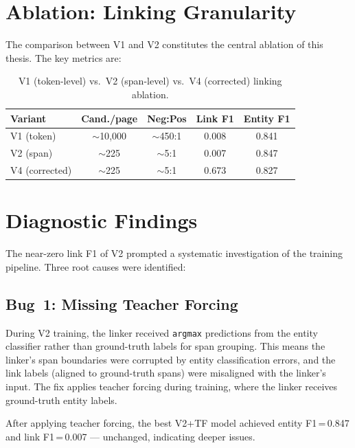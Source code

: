 \section{Ablation: Linking Granularity}
\label{sec:linking-ablation}

The comparison between V1 and V2 constitutes the central ablation of this
thesis. The key metrics are:

\begin{table}[ht]
  \centering
  \caption{V1 (token-level) vs.\ V2 (span-level) vs.\ V4 (corrected) linking ablation.}
  \label{tab:v1-v2-ablation}
  \small
  \begin{tabular}{@{}lcccc@{}}
    \toprule
    \textbf{Variant} & \textbf{Cand./page} & \textbf{Neg:Pos}
                     & \textbf{Link F1} & \textbf{Entity F1} \\
    \midrule
    V1 (token) & $\sim$10{,}000 & $\sim$450:1 & 0.008 & 0.841 \\
    V2 (span)  & $\sim$225 & $\sim$5:1 & 0.007 & 0.847 \\
    V4 (corrected) & $\sim$225 & $\sim$5:1 & 0.673 & 0.827 \\
    \bottomrule
  \end{tabular}
\end{table}

\section{Diagnostic Findings}
\label{sec:diagnostic-results}

The near-zero link F1 of V2 prompted a systematic investigation of the
training pipeline.  Three root causes were identified:

\subsection{Bug~1: Missing Teacher Forcing}

During V2 training, the linker received \texttt{argmax} predictions from the
entity classifier rather than ground-truth labels for span grouping.  This
means the linker's span boundaries were corrupted by entity classification
errors, and the link labels (aligned to ground-truth spans) were misaligned
with the linker's input.  The fix applies teacher forcing during training,
where the linker receives ground-truth entity labels.

After applying teacher forcing, the best V2+TF model achieved entity
F1\,=\,0.847 and link F1\,=\,0.007 --- unchanged, indicating deeper issues.

